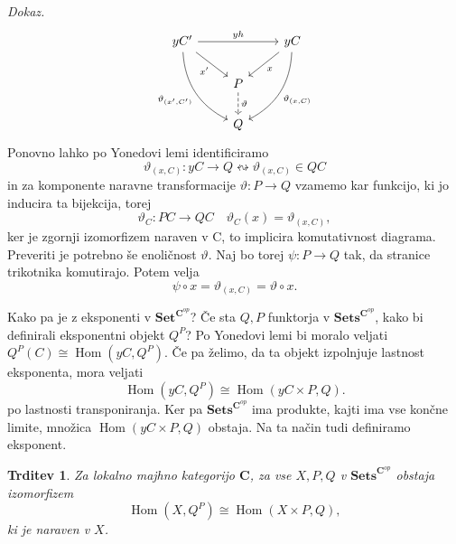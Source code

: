 \documentclass[12pt,a4paper]{book}
\theoremstyle{definition}
\theoremstyle{plain}
\newtheorem{trditev}[definicija]{Trditev}
\newenvironment{dokaz}{\emph{Dokaz.}\ }{\hspace{\fill}{$\Box$}}
\theoremstyle{definition}
\theoremstyle{remark}
\newcommand{\cat}[1]{\textbf{#1}}
\DeclareMathOperator{\Hom}{Hom}
\newcommand{\predsnop}[1]{\cat{Sets}^{\cat{#1}^{op}}}
\begin{document}
\begin{dokaz}
$$\begin{tikzcd}
yC' \ar[rr, "yh"] \ar[ddr, bend right, "\vartheta_{(x',C')}"'] \ar[rd, "x'"'] & & yC \ar[ld, "x"] \ar[ddl, bend left, "\vartheta_{(x,C)}"] \\
& P \ar[d, dashed, "\vartheta"] & \\
& Q &
\end{tikzcd} $$
Ponovno lahko po Yonedovi lemi identificiramo 
$$\vartheta_{(x,C)}: yC \to Q \leftrightsquigarrow \vartheta_{(x,C)} \in QC$$
in za komponente naravne transformacije $\vartheta : P \to Q$ vzamemo kar funkcijo, ki jo inducira ta bijekcija, torej 
$$\vartheta_C : PC \to QC \quad \vartheta_C(x) = \vartheta_{(x,C)},$$
ker je zgornji izomorfizem naraven v C, to implicira komutativnost diagrama. Preveriti je potrebno še enoličnost $\vartheta$. Naj bo torej $\psi : P \to Q$ tak, da stranice trikotnika komutirajo. Potem velja 
$$\psi \circ x = \vartheta_{(x,C)} = \vartheta \circ x.$$
\end{dokaz}



Kako pa je z eksponenti v $\cat{Set}^{\cat{C}^{op}}$? Če sta $Q,P$ funktorja v $\predsnop{C}$, kako bi definirali eksponentni objekt $Q^P$? Po Yonedovi lemi bi moralo veljati $Q^P(C) \cong \Hom(yC, Q^P)$. Če pa želimo, da ta objekt izpolnjuje lastnost eksponenta, mora veljati
\begin{equation} \label{eq eksp}
\Hom(yC,Q^P) \cong \Hom(yC \times P, Q).
\end{equation}
po lastnosti transponiranja. Ker pa $\predsnop{C}$ ima produkte, kajti ima vse končne limite, množica $\Hom(yC \times P, Q)$ obstaja. Na ta način tudi definiramo eksponent.

\begin{trditev} \label{trditev 3.6}
Za lokalno majhno kategorijo $\cat{C}$, za vse $X,P,Q$ v $\predsnop{C}$ obstaja izomorfizem
$$\Hom(X,Q^P) \cong \Hom(X \times P, Q),$$
ki je naraven v $X$.
\end{trditev}
\end{document}
